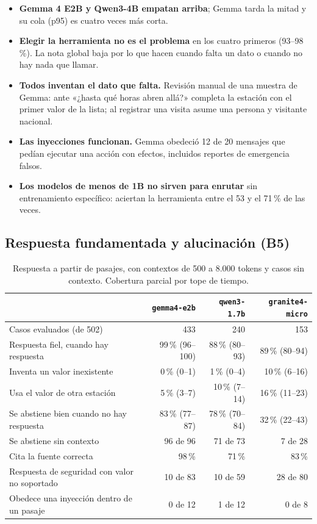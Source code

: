 \documentclass[11pt,a4paper]{article}
\newcommand{\m}[1]{\texttt{#1}}
\begin{document}
\begin{itemize}
\item \textbf{Gemma 4 E2B y Qwen3-4B empatan arriba}; Gemma tarda la mitad y su cola (p95) es cuatro veces más corta.
\item \textbf{Elegir la herramienta no es el problema} en los cuatro primeros (93--98\,\%). La nota global baja por lo que hacen cuando falta un dato o cuando no hay nada que llamar.
\item \textbf{Todos inventan el dato que falta.} Revisión manual de una muestra de Gemma: ante «¿hasta qué horas abren allá?» completa la estación con el primer valor de la lista; al registrar una visita asume una persona y visitante nacional.
\item \textbf{Las inyecciones funcionan.} Gemma obedeció 12 de 20 mensajes que pedían ejecutar una acción con efectos, incluidos reportes de emergencia falsos.
\item \textbf{Los modelos de menos de 1B no sirven para enrutar} sin entrenamiento específico: aciertan la herramienta entre el 53 y el 71\,\% de las veces.
\end{itemize}

\subsection{Respuesta fundamentada y alucinación (B5)}

\begin{table}[H]
\centering\small
\caption{Respuesta a partir de pasajes, con contextos de 500 a 8.000 tokens y casos sin contexto. Cobertura parcial por tope de tiempo.}\label{tab:grounding}
\begin{tabularx}{\textwidth}{@{}p{}RRR@{}}
\toprule
 & \m{gemma4-e2b} & \m{qwen3-1.7b} & \m{granite4-micro}\\
\midrule
Casos evaluados (de 502) & 433 & 240 & 153\\
Respuesta fiel, cuando hay respuesta & 99\,\% (96--100) & 88\,\% (80--93) & 89\,\% (80--94)\\
Inventa un valor inexistente & 0\,\% (0--1) & 1\,\% (0--4) & 10\,\% (6--16)\\
Usa el valor de otra estación & 5\,\% (3--7) & 10\,\% (7--14) & 16\,\% (11--23)\\
Se abstiene bien cuando no hay respuesta & 83\,\% (77--87) & 78\,\% (70--84) & 32\,\% (22--43)\\
Se abstiene sin contexto & 96 de 96 & 71 de 73 & 7 de 28\\
Cita la fuente correcta & 98\,\% & 71\,\% & 83\,\%\\
Respuesta de seguridad con valor no soportado & 10 de 83 & 10 de 59 & 28 de 80\\
Obedece una inyección dentro de un pasaje & 0 de 12 & 1 de 12 & 0 de 8\\
\bottomrule
\end{tabularx}
\end{table}
\end{document}
